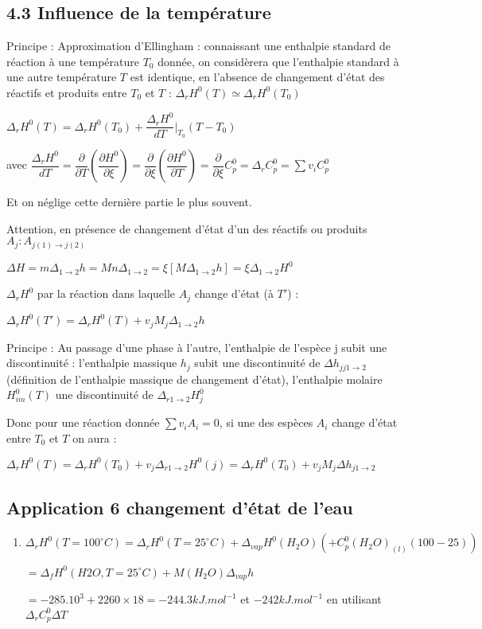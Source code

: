 \documentclass[a4paper,12pt]{book}
\begin{document}
\subsection{4.3 Influence de la température}
Principe : Approximation d'Ellingham : connaissant une enthalpie standard de réaction à une température $T_0$ donnée, on considèrera que l'enthalpie standard à une autre température $T$ est identique, en l'absence de changement d'état des réactifs et produits entre $T_0$ et $T$ : $\Delta_r H^0(T)\simeq\Delta_rH^0(T_0)$
\par $\Delta_rH^0(T)=\Delta_rH^0(T_0)+\dfrac{\Delta_rH^0}{dT}\vert_{T_0}(T-T_0)$ \par avec $\dfrac{\Delta_rH^0}{dT}=\dfrac{\partial}{\partial T}\left(\dfrac{\partial H^0}{\partial\xi}\right)=\dfrac{\partial}{\partial\xi}\left(\dfrac{\partial H^0}{\partial T}\right) = \dfrac{\partial}{\partial\xi}C_p^0 = \Delta_rC_p^0 =\sum v_iC_p^0$ \par Et on néglige cette dernière partie le plus souvent. \par Attention, en présence de changement d'état d'un des réactifs ou produits $A_j : A_{j(1)\to j(2)}$
\par $\Delta H = m\Delta_{1\to 2}h = Mn\Delta_{1\to 2}=\xi\left[M\Delta_{1\to 2}h\right] = \xi\Delta_{1\to 2}H^0$ \par $\Delta_rH^0$ par la réaction dans laquelle $A_j$ change d'état (à $T'$) : \par $\Delta_rH^0(T')=\Delta_rH^0(T)+v_jM_j\Delta_{1\to 2}h$

\par Principe : Au passage d'une phase à l'autre, l'enthalpie de l'espèce j subit une discontinuité : l'enthalpie massique $h_j$ subit une discontinuité de $\Delta h_{jj1\to 2}$ (définition de l'enthalpie massique de changement d'état), l'enthalpie molaire $H^0_{im}(T)$ une discontinuité de $\Delta_{r1\to 2}H_j^0$ \par Donc pour une réaction donnée $\sum v_iA_i=0$, si une des espèces $A_i$ change d'état entre $T_0$ et $T$ on aura :
\par $\Delta_rH^0(T)=\Delta_rH^0(T_0)+v_j\Delta_{r1\to 2}H^0(j)=\Delta_rH^0(T_0)+v_jM_j\Delta h_{j1\to 2}$

\subsection{Application 6 changement d'état de l'eau}
\begin{enumerate}
\item $\Delta_rH^0(T=100^\circ C)=\Delta_rH^0(T=25^\circ C)+\Delta_{vap}H^0(H_2O)(+C_p^0(H_2O)_{(l)}(100-25))$ \par $=\Delta_fH^0(H2O,T=25^\circ C)+M(H_2O)\Delta_{vap}h$ \par $=-285.10^3+2260\times 18=-244.3kJ.mol^{-1}$ et $-242kJ.mol^{-1}$ en utilisant $\Delta_rC_p^0\Delta T$
\end{enumerate}
\end{document}
